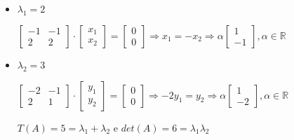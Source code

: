 \documentclass[12pt]{article}
\newcommand{\real}{\mathbb{R}}
\begin{document}
\begin{itemize}
\item $\lambda_1 = 2$
  \begin{center}
    $\begin{bmatrix}
      -1 & -1 \\
      2 & 2
    \end{bmatrix}\cdot
    \begin{bmatrix}
      x_1 \\
      x_2
    \end{bmatrix}=
    \begin{bmatrix}
      0 \\
      0
    \end{bmatrix}\Rightarrow
    x_1=-x_2\Rightarrow
    \alpha
    \begin{bmatrix}
      1 \\
      -1
    \end{bmatrix}, \alpha \in \real$
  \end{center}
\item $\lambda_2 = 3$
  \begin{center}
    $\begin{bmatrix}
      -2 & -1 \\
      2 & 1
    \end{bmatrix}\cdot
    \begin{bmatrix}
      y_1 \\
      y_2
    \end{bmatrix}=
    \begin{bmatrix}
      0 \\
      0
    \end{bmatrix}\Rightarrow
    -2y_1=y_2\Rightarrow
    \alpha
    \begin{bmatrix}
      1 \\
      -2
    \end{bmatrix}, \alpha \in \real$
  \end{center}
  $T(A)=5=\lambda_1+\lambda_2$ e $det(A)=6=\lambda_1\lambda_2$
\end{itemize}
\end{document}
